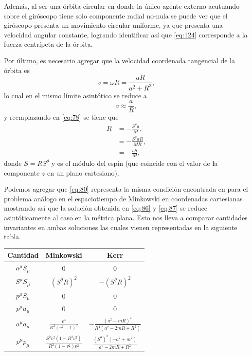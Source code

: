 Además, al ser una órbita circular en donde la único agente externo acutuando sobre el giróscopo tiene solo componente radial no-nula se puede ver que el giróscopo presenta un movimiento circular uniforme, ya que presenta una velocidad angular constante, logrando identificar así que \eqref{eq:124} corresponde a la fuerza centrípeta de la órbita.

Por último, es necesario agregar que la velocidad coordenada tangencial de la órbita es
\begin{equation}
v = \omega R = \frac{aR}{a^2 + R^2},
\end{equation}
lo cual en el mismo límite asintótico se reduce a
\begin{equation}
\label{eq:79}
v \approx \frac{a}{R},
\end{equation}
y reemplazando en \eqref{eq:78} se tiene que
\begin{align}
\nonumber
R &= -\frac{S^{\theta}a}{M},\\
\nonumber
&= -\frac{S^{\theta}aR}{MR},\\
\label{eq:80}
&= -\frac{vS}{M},
\end{align}
donde $S = R S^{\theta}$ y es el módulo del espín (que coincide con el valor de la componente $z$ en un plano cartesiano).

Podemos agregar que \eqref{eq:80} representa la misma condición encontrada en \cite{Costa-Herdeiro-Natario-Zilhao} para el problema análogo en el espaciotiempo de Minkowski en coordenadas cartesianas mostrando así que la solución obtenida en \eqref{eq:86} y \eqref{eq:87} se reduce asintóticamente al caso en la métrica plana. Esto nos lleva a comparar cantidades invariantes en ambas soluciones las cuales vienen representadas en la siguiente tabla.

\begin{center}
\begin{tabular}{|c|c|c|}
\hline
Cantidad & Minkowski & Kerr \\
\hline \hline
$a^{\mu}S_{\mu}$ & 0 & 0 \\
\hline
$S^{\mu}S_{\mu}$ & $(S^{\theta}R )^2$ & $-(S^{\theta}R )^2 $ \\
\hline
$p^{\mu}S_{\mu}$ & 0 & 0 \\
\hline
$p^{\mu}a_{\mu}$ & 0 & 0 \\
\hline
$a^{\mu}a_{\mu}$ & $\frac{v^{4}}{R^{2} \left(v^{2} - 1\right)^{2}}$ & $-\frac{\left(a^{2} - m R\right)^{2}}{R^{4} \left(a^{2} - 2 m R + R^{2}\right)}$ \\
\hline
$p^{\mu}p_{\mu}$ & $ \frac{S^2 v^2 \left( 1 - R^2 v^2 \right)}{R^2 \left( 1 - v^2 \right)v^2} $ & $\frac{(S^{\theta})^{2} \left(- a^{2} + m^{2}\right)}{a^{2} - 2 m R + R^{2}}$ \\
\hline
\end{tabular}
\end{center}

